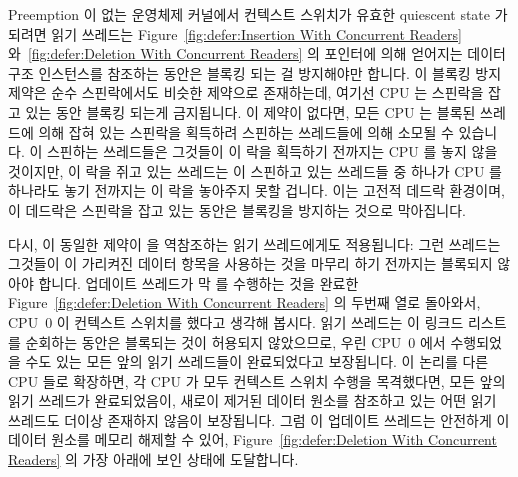 \fi

Preemption 이 없는 운영체제 커널에서 컨텍스트 스위치가 유효한 quiescent state 가 되려면 읽기 쓰레드는
Figure~\ref{fig:defer:Insertion With Concurrent Readers}
와~\ref{fig:defer:Deletion With Concurrent Readers}
의  포인터에 의해 얻어지는 데이터 구조 인스턴스를 참조하는 동안은
블록킹 되는 걸 방지해야만 합니다.
이 블록킹 방지 제약은 순수 스핀락에서도 비슷한 제약으로 존재하는데, 여기선 CPU
는 스핀락을 잡고 있는 동안 블록킹 되는게 금지됩니다.
이 제약이 없다면, 모든 CPU 는 블록된 쓰레드에 의해 잡혀 있는 스핀락을 획득하려
스핀하는 쓰레드들에 의해 소모될 수 있습니다.
이 스핀하는 쓰레드들은 그것들이 이 락을 획득하기 전까지는 CPU 를 놓지 않을
것이지만, 이 락을 쥐고 있는 쓰레드는 이 스핀하고 있는 쓰레드들 중 하나가 CPU 를
하나라도 놓기 전까지는 이 락을 놓아주지 못할 겁니다.
이는 고전적 데드락 환경이며, 이 데드락은 스핀락을 잡고 있는 동안은 블록킹을
방지하는 것으로 막아집니다.

다시, 이 동일한 제약이  을 역참조하는 읽기 쓰레드에게도 적용됩니다:
그런 쓰레드는 그것들이 이 가리켜진 데이터 항목을 사용하는 것을 마무리 하기
전까지는 블록되지 않아야 합니다.
업데이트 쓰레드가 막  를 수행하는 것을 완료한
Figure~\ref{fig:defer:Deletion With Concurrent Readers}
의 두번째 열로 돌아와서, CPU~0 이 컨텍스트 스위치를 했다고 생각해 봅시다.
읽기 쓰레드는 이 링크드 리스트를 순회하는 동안은 블록되는 것이 허용되지
않았으므로, 우린 CPU~0 에서 수행되었을 수도 있는 모든 앞의 읽기 쓰레드들이
완료되었다고 보장됩니다.
이 논리를 다른 CPU 들로 확장하면, 각 CPU 가 모두 컨텍스트 스위치 수행을
목격했다면, 모든 앞의 읽기 쓰레드가 완료되었음이, 새로이 제거된 데이터 원소를
참조하고 있는 어떤 읽기 쓰레드도 더이상 존재하지 않음이 보장됩니다.
그럼 이 업데이트 쓰레드는 안전하게 이 데이터 원소를 메모리 해제할 수 있어,
Figure~\ref{fig:defer:Deletion With Concurrent Readers}
의 가장 아래에 보인 상태에 도달합니다.

